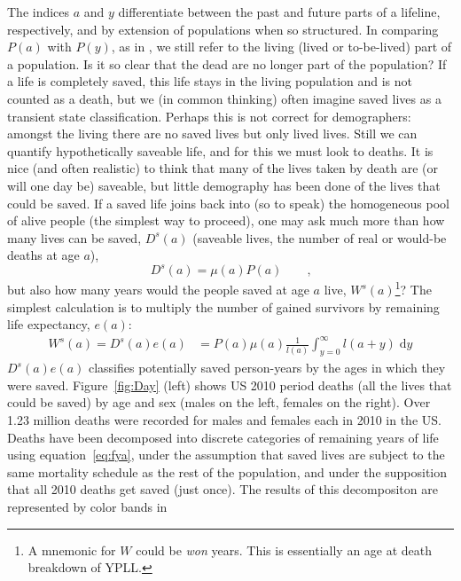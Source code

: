 \documentclass{article}
\newcommand{\dd}{\; \mathrm{d}}
\begin{document}
The indices $a$ and $y$ differentiate between the past and future
parts of a lifeline, respectively, and by extension of populations when
so structured.
In comparing $P(a)$ with $P(y)$, as in \citet{brouard1986structure}, we still
refer to the living (lived or to-be-lived) part of a population.
Is it so clear that the dead are no longer part of the population? If a life is
completely saved, this life stays in the living population and is not counted
as a death, but we (in common thinking) often imagine saved lives as a transient
state classification.
Perhaps this is not correct for demographers: amongst the living there
are no saved lives but only lived lives. Still we can quantify
hypothetically saveable life, and for this we must look to deaths.
It is nice (and often realistic) to think that many of the lives taken by death are (or will one day be) saveable, but little demography has been done of the lives that could be saved. If a saved life joins back into (so to speak) the homogeneous pool of alive people (the simplest way
to proceed), one may ask much more than how many lives can be saved, $D^s(a)$
(saveable lives, the number of real or would-be deaths at age $a$),
\begin{equation}
D^s(a) = \mu(a)P(a) \quad \quad \text{,}
\end{equation}
but also how many years would the people saved at age $a$ live, 
$W^s(a)$\footnote{A mnemonic for $W$ could be \textit{won} years. This is
essentially an age at death breakdown of YPLL.}? The simplest calculation is
to multiply the number of gained survivors by remaining life expectancy, $e(a)$:
\begin{align}
\label{eq:savedea}
W^s(a) = D^s(a)e(a) &= P(a)\mu(a)\frac{1}{l(a)}\int_{y=0}^\infty l(a+y) \dd y
\end{align}
$D^s(a)e(a)$ classifies potentially saved person-years by the
ages in which they were saved. Figure~\ref{fig:Day} (left) shows US 2010 period
deaths (all the lives that could be saved) by age and sex (males on the left,
females on the right). Over 1.23 million deaths were recorded for males
and females each in 2010 in the US. Deaths have been decomposed into discrete
categories of remaining years of life using equation~\eqref{eq:fya}, under the assumption that saved lives are subject to the same mortality schedule as the rest of the population, and under the supposition that all 2010 deaths get saved (just once). The results of this decompositon are represented by color bands in
\end{document}
